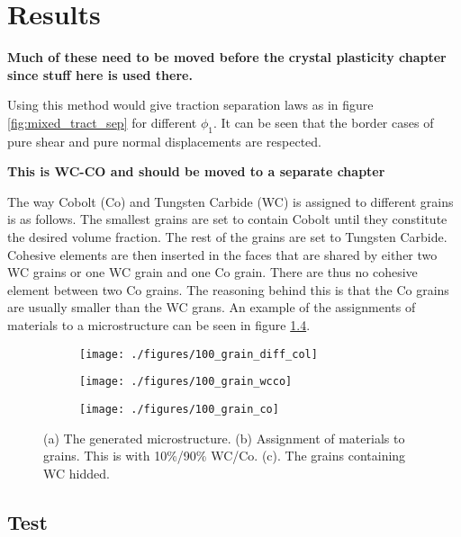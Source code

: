 \documentclass[wcco.tex]{subfiles}
\begin{document}
\chapter{Results}


\textbf{Much of these need to be moved before the crystal plasticity chapter since stuff here is used there.}

Using this method would give traction separation laws as in figure \ref{fig:mixed_tract_sep} for different $\phi_1$. It can be seen that the border cases of pure shear and pure normal displacements are respected.


\textbf{This is WC-CO and should be moved to a separate chapter}

The way Cobolt (Co) and Tungsten Carbide (WC) is assigned to different grains is as follows. The smallest grains are set to contain Cobolt until they constitute the desired volume fraction. The rest of the grains are set to Tungsten Carbide. Cohesive elements are then inserted in the faces that are shared by either two WC grains or one WC grain and one Co grain. There are thus no cohesive element between two Co grains. The reasoning behind this is that the Co grains are usually smaller than the WC grans.  An example of the assignments of materials to a microstructure can be seen in figure \ref{fig:cowc}.

\begin{figure}
\centering
\begin{subfigure}[b]{.5\textwidth}
  \centering
  \texttt{[image: ./figures/100\_grain\_diff\_col]}
  \caption{}
  \label{fig:cowc_a}
\end{subfigure}%
\hspace{-10mm}
\begin{subfigure}[b]{.5\textwidth}
  \centering
  \texttt{[image: ./figures/100\_grain\_wcco]}
  \caption{}
  \label{fig:cowc_b}
\end{subfigure}%
\hspace{-10mm}
\begin{subfigure}[b]{.5\textwidth}
  \centering
  \texttt{[image: ./figures/100\_grain\_co]}
  \caption{}
  \label{fig:cowc_c}
\end{subfigure}
\caption{(a) The generated microstructure. (b) Assignment of materials to grains. This is with 10\%/90\% WC/Co. (c). The grains containing WC hidded.}
\label{fig:cowc}
\end{figure}



\section{Test}
\end{document}

